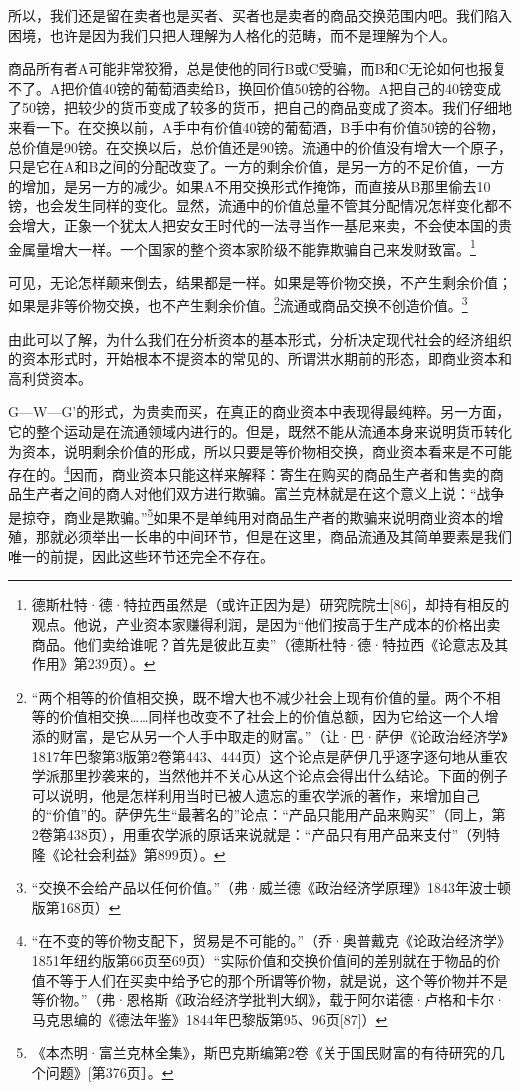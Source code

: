 \documentclass{ctexbook}
\begin{document}
    所以，我们还是留在卖者也是买者、买者也是卖者的商品交换范围内吧。我们陷入困境，也许是因为我们只把人理解为人格化的范畴，而不是理解为个人。

    商品所有者A可能非常狡猾，总是使他的同行B或C受骗，而B和C无论如何也报复不了。A把价值40镑的葡萄酒卖给B，换回价值50镑的谷物。A把自己的40镑变成了50镑，把较少的货币变成了较多的货币，把自己的商品变成了资本。我们仔细地来看一下。在交换以前，A手中有价值40镑的葡萄酒，B手中有价值50镑的谷物，总价值是90镑。在交换以后，总价值还是90镑。流通中的价值没有增大一个原子，只是它在A和B之间的分配改变了。一方的剩余价值，是另一方的不足价值，一方的增加，是另一方的减少。如果A不用交换形式作掩饰，而直接从B那里偷去10镑，也会发生同样的变化。显然，流通中的价值总量不管其分配情况怎样变化都不会增大，正象一个犹太人把安女王时代的一法寻当作一基尼来卖，不会使本国的贵金属量增大一样。一个国家的整个资本家阶级不能靠欺骗自己来发财致富。\footnote{德斯杜特·德·特拉西虽然是（或许正因为是）研究院院士[86]，却持有相反的观点。他说，产业资本家赚得利润，是因为“他们按高于生产成本的价格出卖商品。他们卖给谁呢？首先是彼此互卖”（德斯杜特·德·特拉西《论意志及其作用》第239页）。}

    可见，无论怎样颠来倒去，结果都是一样。如果是等价物交换，不产生剩余价值；如果是非等价物交换，也不产生剩余价值。\footnote{“两个相等的价值相交换，既不增大也不减少社会上现有价值的量。两个不相等的价值相交换……同样也改变不了社会上的价值总额，因为它给这一个人增添的财富，是它从另一个人手中取走的财富。”（让·巴·萨伊《论政治经济学》1817年巴黎第3版第2卷第443、444页）这个论点是萨伊几乎逐字逐句地从重农学派那里抄袭来的，当然他并不关心从这个论点会得出什么结论。下面的例子可以说明，他是怎样利用当时已被人遗忘的重农学派的著作，来增加自己的“价值”的。萨伊先生“最著名的”论点：“产品只能用产品来购买”（同上，第2卷第438页），用重农学派的原话来说就是：“产品只有用产品来支付”（列特隆《论社会利益》第899页）。}流通或商品交换不创造价值。\footnote{“交换不会给产品以任何价值。”（弗·威兰德《政治经济学原理》1843年波士顿版第168页）}

    由此可以了解，为什么我们在分析资本的基本形式，分析决定现代社会的经济组织的资本形式时，开始根本不提资本的常见的、所谓洪水期前的形态，即商业资本和高利贷资本。

    G—W—G'的形式，为贵卖而买，在真正的商业资本中表现得最纯粹。另一方面，它的整个运动是在流通领域内进行的。但是，既然不能从流通本身来说明货币转化为资本，说明剩余价值的形成，所以只要是等价物相交换，商业资本看来是不可能存在的。\footnote{“在不变的等价物支配下，贸易是不可能的。”（乔·奥普戴克《论政治经济学》1851年纽约版第66页至69页）“实际价值和交换价值间的差别就在于物品的价值不等于人们在买卖中给予它的那个所谓等价物，就是说，这个等价物并不是等价物。”（弗·恩格斯《政治经济学批判大纲》，载于阿尔诺德·卢格和卡尔·马克思编的《德法年鉴》1844年巴黎版第95、96页[87]）}因而，商业资本只能这样来解释：寄生在购买的商品生产者和售卖的商品生产者之间的商人对他们双方进行欺骗。富兰克林就是在这个意义上说：“战争是掠夺，商业是欺骗。”\footnote{《本杰明·富兰克林全集》，斯巴克斯编第2卷《关于国民财富的有待研究的几个问题》[第376页］。}如果不是单纯用对商品生产者的欺骗来说明商业资本的增殖，那就必须举出一长串的中间环节，但是在这里，商品流通及其简单要素是我们唯一的前提，因此这些环节还完全不存在。
\end{document}
